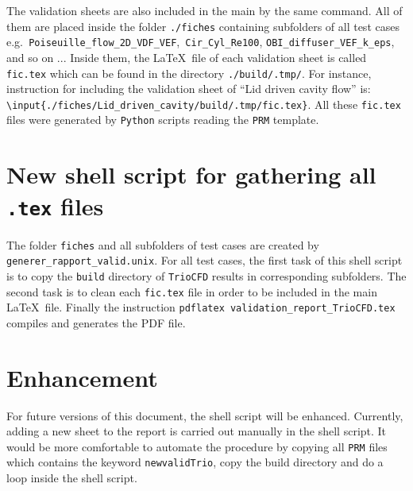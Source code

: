 The validation sheets are also included in the main by the same command.
All of them are placed inside the folder \texttt{./fiches} containing
subfolders of all test cases e.g.\texttt{ Poiseuille\_flow\_2D\_VDF\_VEF},\texttt{
Cir\_Cyl\_Re100}, \texttt{OBI\_diffuser\_VEF\_k\_eps}, and so on ...
Inside them, the \LaTeX~file of each validation sheet is called
\texttt{fic.tex} which can be found in the directory \texttt{./build/.tmp/}.
For instance, instruction for including the validation sheet of ``Lid
driven cavity flow'' is:\newline
\texttt{ \textbackslash{}input\{./fiches/Lid\_driven\_cavity/build/.tmp/fic.tex\}}.
All these \texttt{fic.tex} files were generated by \texttt{Python} scripts reading
the \texttt{PRM} template.
\section{\label{sec:Generating-the-report}New shell script for gathering all \texttt{.tex} files}
The folder \texttt{fiches} and all subfolders of test cases are created
by \texttt{generer\_rapport\_valid.unix}. For all test cases, the
first task of this shell script is to copy the \texttt{build} directory
of \texttt{TrioCFD} results in corresponding subfolders. The second
task is to clean each \texttt{fic.tex} file in order to be included
in the main \LaTeX~file. Finally the instruction \texttt{pdflatex
validation\_report\_TrioCFD.tex} compiles and generates the PDF file.

\section{Enhancement}
For future versions of this document, the shell script will be enhanced.
Currently, adding a new sheet to the report is carried out manually
in the shell script. It would be more comfortable to automate the
procedure by copying all \texttt{PRM} files which contains the keyword
\texttt{newvalidTrio}, copy the build directory and do a loop inside
the shell script.
